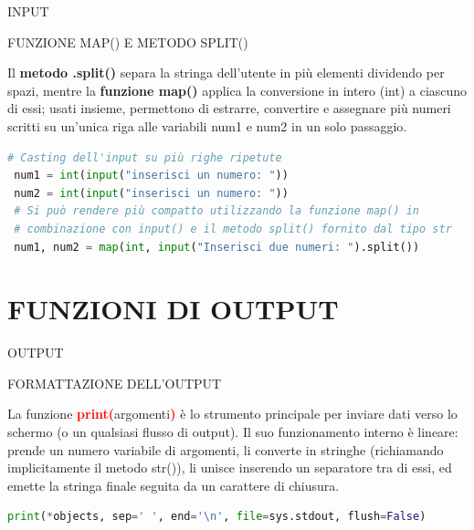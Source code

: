 \documentclass[aspectratio=1610]{beamer}
\begin{document}
\begin{frame}[fragile]{INPUT}
    \begin{alertblock}{FUNZIONE MAP() E METODO SPLIT()}
        \begin{minipage}{0.98\linewidth}
            \justifying
            Il \textbf{metodo .split()} separa la stringa dell'utente in più elementi dividendo per spazi, 
            mentre la \textbf{funzione map()} applica la conversione in intero (int) a ciascuno di essi; 
            usati insieme, permettono di estrarre, convertire e assegnare più numeri scritti su 
            un'unica riga alle variabili num1 e num2 in un solo passaggio.
            \bigskip
\begin{lstlisting}[language=Python]
 # Casting dell'input su più righe ripetute
 num1 = int(input("inserisci un numero: "))
 num2 = int(input("inserisci un numero: "))
 # Si può rendere più compatto utilizzando la funzione map() in
 # combinazione con input() e il metodo split() fornito dal tipo str
 num1, num2 = map(int, input("Inserisci due numeri: ").split())
\end{lstlisting}
        \end{minipage}
    \end{alertblock}
\end{frame}

\section{FUNZIONI DI OUTPUT}

\begin{frame}[fragile]{OUTPUT}
    \begin{alertblock}{FORMATTAZIONE DELL'OUTPUT}
        \begin{minipage}{0.98\linewidth}
            \justifying
            La funzione \textcolor{red}{\textbf{print(}}argomenti\textcolor{red}{\textbf{)}} è lo strumento 
            principale per inviare dati verso lo schermo (o un qualsiasi flusso di output). Il suo 
            funzionamento interno è lineare: prende un numero variabile di argomenti, li converte 
            in stringhe (richiamando implicitamente il metodo str()), li unisce inserendo un separatore 
            tra di essi, ed emette la stringa finale seguita da un carattere di chiusura.
            \bigskip
\begin{lstlisting}[language=Python]
 print(*objects, sep=' ', end='\n', file=sys.stdout, flush=False)
\end{lstlisting}
        \end{minipage}
    \end{alertblock}
\end{frame}
\end{document}

